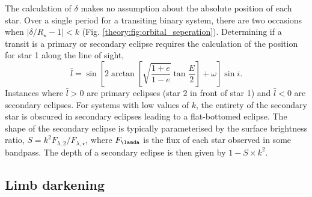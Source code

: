 The calculation of $\delta$ makes no assumption about the absolute position of each star. Over a single period for a transiting binary system, there are two occasions when $|\delta / R_\star - 1| < k$ (Fig. \ref{theory:fig:orbital_seperation}). Determining if a transit is a primary or secondary eclipse requires the calculation of the position for star 1 along the line of sight,
%
\begin{equation}
\bar{l} = \sin{ \left[ 2  \arctan{ \left[ \sqrt{\frac{1 + e}{1 - e}} \tan{\frac{E}{2}} \right] } + \omega \right] } \sin{i} . 
\end{equation} 
%
Instances where $\bar{l} > 0$ are primary eclipses (star 2 in front of star 1) and $\bar{l} < 0$ are secondary eclipses. For systems with low values of $k$, the entirety of the secondary star is obscured in secondary eclipses leading to a flat-bottomed eclipse. The shape of the secondary eclipse is typically parameterised by the surface brightness ratio, $S = k^2 F_{\lambda,2} / F_{\lambda,\star}$, where $F_{\lamda}$ is the flux of each star observed in some bandpass. The depth of a secondary eclipse is then given by $1-S \times k^2$.   


\subsection{Limb darkening}


